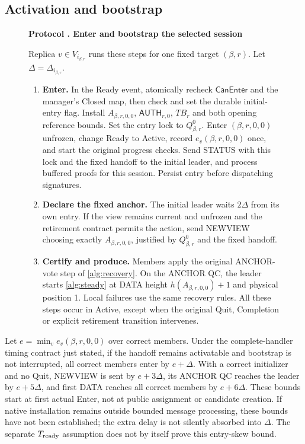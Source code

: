 \documentclass[11pt,a4paper]{article}
\newcommand{\TB}{\mathit{TB}}
\newcommand{\tagg}[1]{\ensuremath{\mathsf{#1}}}
\newcounter{protocol}
\newenvironment{protocol}[3][htbp]{\begin{figure}[#1]\refstepcounter{protocol}\label{#2}
\begin{mdframed}[linewidth=.6pt,skipabove=0pt,skipbelow=0pt,
innertopmargin=7pt,innerbottommargin=7pt]\small
\textbf{Protocol \theprotocol. #3}\par\smallskip}{\end{mdframed}\end{figure}}
\begin{document}
\subsection{Activation and bootstrap}
\label{sec:ready}
\begin{protocol}[H]{alg:bootstrap}{Enter and bootstrap the selected session}
Replica $v\in V_{i_{\beta,r}}$ runs these steps for one fixed target
$(\beta,r)$. Let $\Delta=\Delta_{i_{\beta,r}}$.
\begin{enumerate}[label=\textbf{\arabic*)},itemsep=3pt]
\item \textbf{Enter.} In the Ready event, atomically recheck
$\tagg{CanEnter}$ and the manager's Closed map, then check and set
the durable initial-entry flag. Install $A_{\beta,r,0,0}$,
$\tagg{AUTH}_{r,0}$, $\TB_r$ and both opening reference bounds.
Set the entry lock to $Q^0_{\beta,r}$. Enter $(\beta,r,0,0)$
unfrozen, change Ready to Active, record $e_v(\beta,r,0,0)$ once,
and start the original progress checks. Send STATUS with this lock
and the fixed handoff to the initial leader, and process buffered
proofs for this session. Persist entry before dispatching signatures.
\item \textbf{Declare the fixed anchor.} The initial leader waits
$2\Delta$ from its own entry. If the view remains current and
unfrozen and the retirement contract permits the action, send NEWVIEW
choosing exactly $A_{\beta,r,0,0}$, justified by $Q^0_{\beta,r}$
and the fixed handoff.
\item \textbf{Certify and produce.} Members apply the original
ANCHOR-vote step of \cref{alg:recovery}. On the ANCHOR QC, the leader
starts \cref{alg:steady} at DATA height $h(A_{\beta,r,0,0})+1$
and physical position 1. Local failures use the same recovery rules.
All these steps occur in Active, except when the original Quit,
Completion or explicit retirement transition intervenes.
\end{enumerate}
\end{protocol}

Let $e=\min_v e_v(\beta,r,0,0)$ over correct members. Under the
complete-handler timing contract just stated, if the handoff remains
activatable and bootstrap is not interrupted, all correct members enter
by $e+\Delta$. With a correct initializer and no Quit, NEWVIEW is sent
by $e+3\Delta$, its ANCHOR QC reaches the leader by $e+5\Delta$, and
first DATA reaches all correct members by $e+6\Delta$. These bounds
start at first actual Enter, not at public assignment or candidate creation.
If native installation remains outside bounded message processing, these
bounds have not been established; the extra delay is not silently absorbed
into $\Delta$. The separate $T_{\rm ready}$ assumption does not by itself prove this entry-skew bound.
\end{document}
